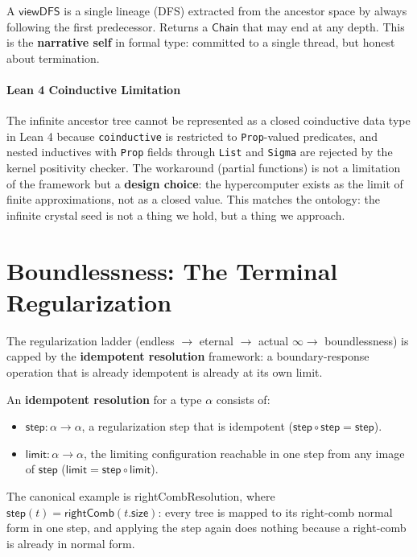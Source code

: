 \begin{definition}
\label{def:viewDFS}
\leanok
{}
A $\mathsf{viewDFS}$ is a single lineage (DFS) extracted from the ancestor
space by always following the first predecessor. Returns a $\mathsf{Chain}$
that may end at any depth. This is the \textbf{narrative self} in formal
type: committed to a single thread, but honest about termination.
\end{definition}

\paragraph{Lean 4 Coinductive Limitation}
\leanok
The infinite ancestor tree cannot be represented as a closed coinductive
data type in Lean 4 because \texttt{coinductive} is restricted to
\texttt{Prop}-valued predicates, and nested inductives with \texttt{Prop}
fields through \texttt{List} and \texttt{Sigma} are rejected by the kernel
positivity checker. The workaround (partial functions) is not a limitation
of the framework but a \textbf{design choice}: the hypercomputer exists as
the limit of finite approximations, not as a closed value. This matches
the ontology: the infinite crystal seed is not a thing we hold, but a
thing we approach.

\section{Boundlessness: The Terminal Regularization}
\label{sec:boundlessness}

The regularization ladder (endless $\to$ eternal $\to$ actual $\infty \to$
boundlessness) is capped by the \textbf{idempotent resolution} framework:
a boundary-response operation that is already idempotent is already at its
own limit.

\begin{definition}
\label{def:idempotent_resolution}
\leanok
{}
An \textbf{idempotent resolution} for a type $\alpha$ consists of:
\begin{itemize}
  \item $\mathsf{step} : \alpha \to \alpha$, a regularization step that is
    idempotent ($\mathsf{step} \circ \mathsf{step} = \mathsf{step}$).
  \item $\mathsf{limit} : \alpha \to \alpha$, the limiting configuration
    reachable in one step from any image of $\mathsf{step}$
    ($\mathsf{limit} = \mathsf{step} \circ \mathsf{limit}$).
\end{itemize}
The canonical example is \textsf{rightCombResolution}, where
$\mathsf{step}(t) = \mathsf{rightComb}(t.\mathsf{size})$: every tree is
mapped to its right-comb normal form in one step, and applying the step
again does nothing because a right-comb is already in normal form.
\end{definition}

